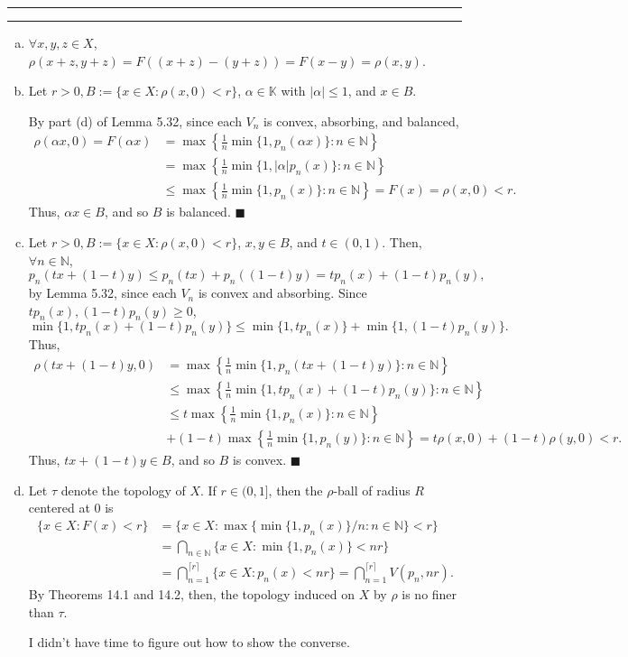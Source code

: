 \documentclass[11pt]{article}
\newcounter{questionCounter}
\newcounter{partCounter}[questionCounter]
\newenvironment{question}[2][\arabic{questionCounter}]{%
    \setcounter{partCounter}{0}%
    \vspace{.25in} \hrule \vspace{0.5em}%
        \noindent{\bf #2}%
    \vspace{0.8em} \hrule \vspace{.10in}%
    \addtocounter{questionCounter}{1}%
}{}
\renewcommand{\qed}{\quad $\blacksquare$}
\newcommand{\N}{\mathbb{N}} %
\newcommand{\K}{\mathbb{K}} %
\begin{document}
\begin{question}{Problem 5}
\begin{enumerate}[(a)]
\item $\forall x,y,z \in X$,
$\rho(x + z,y + z) = F((x + z) - (y + z)) = F(x - y) = \rho(x,y)$.

\item Let $r > 0, B := \{x \in X : \rho(x,0) < r\}$, $\alpha \in \K$ with
$|\alpha| \leq 1$, and $x \in B$.

By part (d) of Lemma 5.32, since each $V_n$ is convex, absorbing, and balanced,
\begin{align*}
\rho(\alpha x,0)
    = F(\alpha x)
    & = \max \left\{ \frac1n\min\{1,p_n(\alpha x)\} : n \in \N \right\}     \\
    & = \max \left\{ \frac1n\min\{1,|\alpha| p_n(x)\} : n \in \N \right\}   \\
    & \leq \max\left\{\frac1n\min\{1,p_n(x)\} : n \in \N\right\}
      = F(x)
      = \rho(x,0)
      < r.
\end{align*}
Thus, $\alpha x \in B$, and so $B$ is balanced. \qed

\item Let $r > 0, B := \{x \in X : \rho(x,0) < r\}$, $x,y \in B$, and
$t \in (0,1)$. Then, $\forall n \in \N$,
\[p_n(tx + (1 - t)y) \leq p_n(tx) + p_n((1 - t)y) = tp_n(x) + (1 - t)p_n(y),\]
by Lemma 5.32, since each $V_n$ is convex and absorbing.
Since $tp_n(x), (1 - t)p_n(y) \geq 0$,
\[\min\{1,tp_n(x) + (1 - t)p_n(y)\}
    \leq \min\{1,tp_n(x)\} + \min\{1,(1 - t)p_n(y)\}.
\]
Thus,
\begin{align*}
\rho(tx + (1 - t)y,0)
    & = \max \left\{ \frac1n\min\{1,p_n(tx + (1 - t)y)\} : n \in \N \right\}     \\
    & \leq \max \left\{ \frac1n\min\{1,tp_n(x) + (1 - t)p_n(y)\} : n \in \N \right\}   \\
    & \leq t\max \left\{ \frac1n\min\{1,p_n(x)\} : n \in \N \right\}   \\
    & + (1 - t)\max \left\{ \frac1n\min\{1,p_n(y)\} : n \in \N \right\}   
     = t\rho(x,0) + (1 - t)\rho(y,0)
      < r.
\end{align*}
Thus, $tx + (1 - t)y \in B$, and so $B$ is convex. \qed

\item Let $\tau$ denote the topology of $X$. If $r \in (0,1]$, then the
$\rho$-ball of radius $R$ centered at $0$ is
\begin{align*}
\{x \in X : F(x) < r\}
    & = \{x \in X : \max\{\min\{1,p_n(x)\}/n : n \in \N\} < r\}   \\
    & = \bigcap_{n \in \N} \{x \in X : \min\{1,p_n(x)\} < nr\}  \\
    & = \bigcap_{n = 1}^{\lceil r \rceil} \{x \in X : p_n(x) < nr\}
      = \bigcap_{n = 1}^{\lceil r \rceil} V(p_n,nr).
\end{align*}
By Theorems 14.1 and 14.2, then, the topology induced on $X$ by $\rho$ is no
finer than $\tau$.

I didn't have time to figure out how to show the converse.
\end{enumerate}
\end{question}
\end{document}
